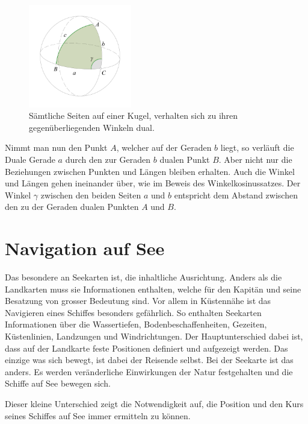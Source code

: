 \begin{refsection}
\begin{figure}[htbp]
\centering
\includegraphics[width=0.4\textwidth]{kugel/Dualitaet.jpg}
\caption{Sämtliche Seiten auf einer Kugel, verhalten sich zu ihren gegenüberliegenden Winkeln dual.}
\end{figure}


Nimmt man nun den Punkt $A$, welcher auf der Geraden $b$ liegt, so verläuft die Duale Gerade $a$ durch den zur Geraden $b$ dualen Punkt $B$. 
Aber nicht nur die Beziehungen zwischen Punkten und Längen bleiben erhalten. Auch die Winkel und Längen gehen ineinander über, wie im Beweis des Winkelkosinussatzes.
Der Winkel $\gamma$ zwischen den beiden Seiten $a$ und $b$ entspricht dem Abstand zwischen den zu der Geraden dualen Punkten $A$ und $B$.



\section{Navigation auf See}
Das besondere an Seekarten ist, die inhaltliche Ausrichtung. Anders als die Landkarten muss sie Informationen enthalten, welche für den Kapitän und seine Besatzung von grosser Bedeutung sind. Vor allem in Küstennähe ist das Navigieren eines Schiffes besonders gefährlich. So enthalten Seekarten Informationen über die Wassertiefen, Bodenbeschaffenheiten, Gezeiten, Küstenlinien, Landzungen und Windrichtungen.
Der Hauptunterschied dabei ist, dass auf der Landkarte feste Positionen definiert und aufgezeigt werden. Das einzige was sich bewegt, ist dabei der Reisende selbst. Bei der Seekarte ist das anders. Es werden veränderliche Einwirkungen der Natur festgehalten und die Schiffe auf See bewegen sich.

Dieser kleine Unterschied zeigt die Notwendigkeit auf, die Position und den Kurs seines Schiffes auf See immer ermitteln zu können.



\end{refsection}
